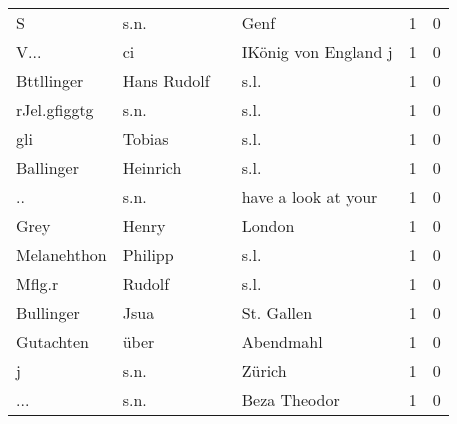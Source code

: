 \begin{tabular}{llllrr}
                        S &                               s.n. &             &                                        Genf &          1 &         0 \\
                     V... &                                 ci &             &                        IKönig von England j &          1 &         0 \\
               Bttllinger &                        Hans Rudolf &             &                                        s.l. &          1 &         0 \\
             rJel.gfiggtg &                               s.n. &             &                                        s.l. &          1 &         0 \\
                      gli &                             Tobias &             &                                        s.l. &          1 &         0 \\
                Ballinger &                           Heinrich &             &                                        s.l. &          1 &         0 \\
                       .. &                               s.n. &             &                         have a look at your &          1 &         0 \\
                     Grey &                              Henry &             &                                      London &          1 &         0 \\
              Melanehthon &                            Philipp &             &                                        s.l. &          1 &         0 \\
                   Mflg.r &                             Rudolf &             &                                        s.l. &          1 &         0 \\
                Bullinger &                               Jsua &             &                                  St. Gallen &          1 &         0 \\
                Gutachten &                               über &             &                                   Abendmahl &          1 &         0 \\
                        j &                               s.n. &             &                                      Zürich &          1 &         0 \\
                      ... &                               s.n. &             &                                Beza Theodor &          1 &         0 \\

\end{tabular}
